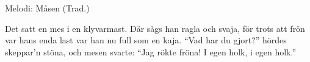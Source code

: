 \begin{song}

\begin{songmeta}
Melodi: Måsen (Trad.)
\end{songmeta}

\begin{songtext}
Det satt en mes i en klyvarmast.
Där sågs han ragla och svaja,
för trots att frön var hans enda last
var han nu full som en kaja.
\textquotedblleft{}Vad har du gjort?\textquotedblright{} hördes skeppar'n stöna,
och mesen svarte: \textquotedblleft{}Jag rökte fröna!
I egen holk,
i egen holk.\textquotedblright{}
\end{songtext}

\end{song}

